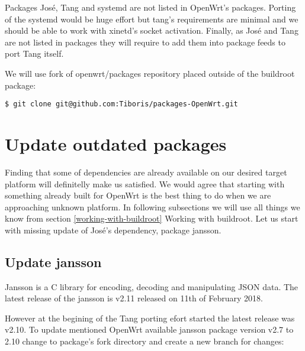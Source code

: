 Packages José, Tang and systemd are not listed in OpenWrt's packages.
Porting of the systemd would be huge effort but tang's requirements are minimal and we should be able to work with xinetd's socket activation.
Finally, as José and Tang are not listed in packages they will require to add them into package feeds to port Tang itself.

We will use fork of openwrt/packages repository placed outside of the buildroot package:
\begin{lstlisting}[columns=fixed,basicstyle=\ttfamily\footnotesize,tabsize=4,backgroundcolor=\color{yellow!10}]
$ git clone git@github.com:Tiboris/packages-OpenWrt.git
\end{lstlisting}



\section{Update outdated packages}

Finding that some of dependencies are already available on our desired target platform will definitelly make us satisfied.
We would agree that starting with something already built for OpenWrt is the best thing to do when we are approaching unknown platform.
In following subsections we will use all things we know from section \ref{working-with-buildroot} Working with buildroot.
Let us start with missing update of José's dependency, package jansson.



\subsection{Update jansson}\label{jansson}
Jansson is a C library for encoding, decoding and manipulating JSON data.
The latest release of the jansson is v2.11 released on 11th of February 2018\cite{jansson}.

However at the begining of the Tang porting efort started the latest release was v2.10.
To update mentioned OpenWrt available jansson package version v2.7 to 2.10 change to package's fork directory and create a new branch for changes:

